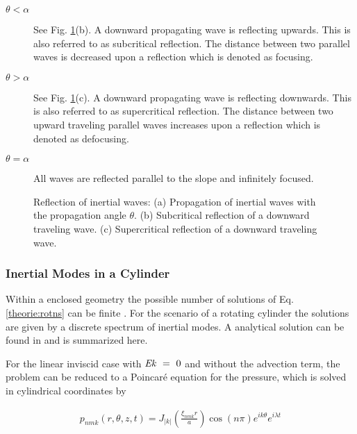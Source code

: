 \begin{description}
    \item[$\theta < \alpha$] See Fig. \ref{theorie:reflection_img}(b). A downward propagating wave is reflecting upwards.
                             This is also referred to as subcritical reflection.
                             The distance between two parallel waves is decreased upon a reflection which is denoted as focusing.
    \item[$\theta > \alpha$] See Fig. \ref{theorie:reflection_img}(c). A downward propagating wave is reflecting downwards.
                             This is also referred to as supercritical reflection.
                             The distance between two upward traveling parallel waves increases upon a reflection which is denoted as defocusing.
    \item[$\theta = \alpha$] All waves are reflected parallel to the slope and infinitely focused.
\end{description}

\begin{figure}[!bp]
      \centering
          \centering
       \caption{Reflection of inertial waves:
        (a) Propagation of inertial waves with the propagation angle $\theta$.
        (b) Subcritical reflection of a downward traveling wave.
        (c) Supercritical reflection of a downward traveling wave.
       }
       \label{theorie:reflection_img}
\end{figure}

\clearpage


\subsubsection{Inertial Modes in a Cylinder}
\label{theorie:rotating:cyl_modes}

Within  a enclosed geometry the possible number of solutions of Eq. \ref{theorie:rotns} can be finite \citep{Clausen2011}.
For the scenario of a rotating cylinder the solutions are given by a discrete spectrum of  inertial modes.
A analytical solution can be found in \citep{Greenspan1990} and is summarized here.

For the linear inviscid case with $\mbox{\textit{Ek}}~=~0$ and without the advection term, the problem can be reduced to a Poincar\'{e} equation for the pressure,
which is solved in cylindrical coordinates by

\begin{align}
    p_{nmk}(r, \theta, z, t) = J_{|k|}\left(\frac{\xi_{nmk}r}{a} \right)\cos(n\pi)e^{ik\theta}e^{i\lambda t}
\end{align}

